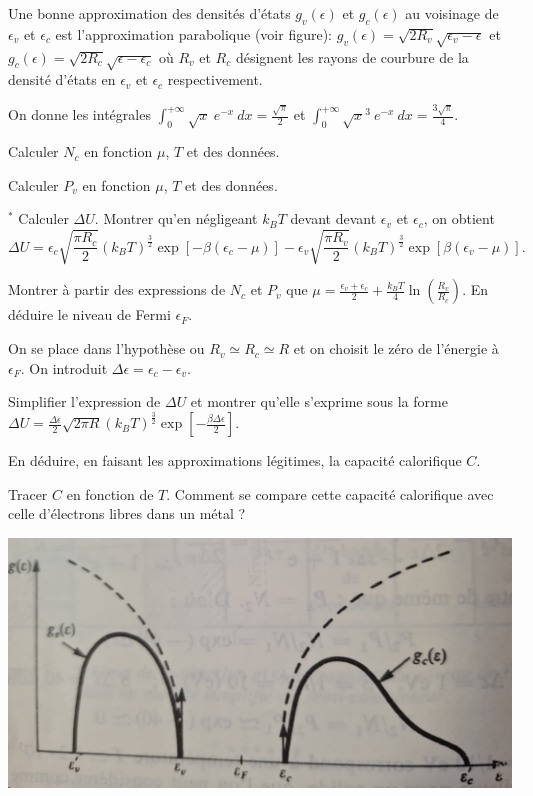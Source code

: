 \documentclass[utf8, 11pt]{feuille}
\begin{document}
Une bonne approximation des densités d'états $g_v(\epsilon)$ et $g_c(\epsilon)$ au voisinage de $\epsilon_v$ et $\epsilon_c$ est l'approximation parabolique (voir figure): $g_v(\epsilon)=\sqrt{2R_v} \sqrt{\epsilon_v-\epsilon}$ et $g_c(\epsilon)=\sqrt{2R_c} \sqrt{\epsilon-\epsilon_c}$ où $R_v$ et $R_c$ désignent les rayons de courbure de la densité d'états  en $\epsilon_v$ et  $\epsilon_c$ respectivement. 

On donne les intégrales $\int_{0}^{+\infty} \sqrt{x} \ e^{-x} \ dx =\frac{\sqrt{\pi}}{2}$ et  $\int_{0}^{+\infty} \sqrt{x}^3 \ e^{-x} \ dx =\frac{3\sqrt{\pi}}{4}$.


\question Calculer $N_c$ en fonction  $\mu$, $T$ et des données.

\question  Calculer $P_v$ en fonction  $\mu$, $T$ et des données.

\question$^*$ Calculer $\Delta U$.  Montrer qu'en négligeant $k_B T$ devant  devant $\epsilon_v$ et $\epsilon_c$, on obtient
\begin{equation*}
\Delta U=\epsilon_c \sqrt{\frac{\pi R_c}{2}} (k_BT)^{\frac{3}{2}} \exp[-\beta(\epsilon_c-\mu)] - \epsilon_v \sqrt{\frac{\pi R_v}{2}} (k_BT)^{\frac{3}{2}} \exp[\beta(\epsilon_v-\mu)].
\end{equation*}


\question Montrer à partir des expressions de $N_c$ et $P_v$ que $\mu=\frac{\epsilon_v+\epsilon_c}{2}+\frac{k_BT}{4} \ln (\frac{R_v}{R_c})$. En déduire le niveau de Fermi $\epsilon_F$.


On se place dans l'hypothèse ou $R_v \simeq R_c \simeq R$ et on choisit le zéro de l'énergie à $\epsilon_F$. On introduit $\Delta \epsilon=\epsilon_c-\epsilon_v$.

\question Simplifier l'expression de $\Delta U$ et montrer qu'elle s'exprime sous la forme $\Delta U=\frac{\Delta \epsilon}{2} \sqrt{2\pi R}  (k_BT)^{\frac{3}{2}} \exp[-\frac{\beta \Delta \epsilon}{2}]$.

\question En déduire, en faisant les approximations légitimes,  la capacité calorifique $C$.

\question Tracer $C$ en fonction de $T$. Comment se compare cette capacité calorifique avec celle d'électrons libres dans un métal ?
\

\centerline{\includegraphics[height=.32\textwidth]{bandes.png}}
\end{document}
